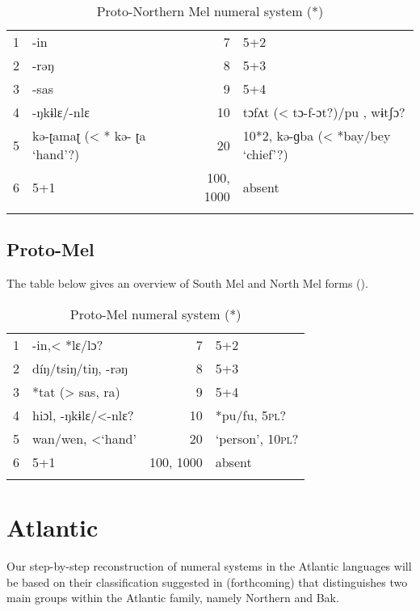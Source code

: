 {\begin{table}
\caption{\label{tab:3:218}Proto-Northern Mel numeral system (*)}


\begin{tabularx}{\textwidth}{lQrQ}
\lsptoprule

1 & -in & 7 & 5+2\\
2 & -rəŋ & 8 & 5+3\\
3 & -sas & 9 & 5+4\\
4 & -ŋkɨlɛ/-nlɛ & 10 & tɔfʌt (< tɔ-f-ɔt?)/pu , wɨtʃɔ? \\
5 & kə-ʈamaʈ (< * kə- ʈa ‘hand’?) & 20 & 10*2, kə-ɡba (< *bay/bey ‘chief’?)\\
6 & 5+1 & 100, 1000 & absent\\
\lspbottomrule
\end{tabularx}
\end{table}

\clearpage
\subsection{Proto-Mel}%
The table below gives an overview of South Mel and North Mel forms ().

\begin{table}
\caption{\label{tab:3:219}Proto-Mel numeral system (*)}


\begin{tabularx}{\textwidth}{lQrQ}
\lsptoprule

1 & -in,< *lɛ/lɔ? & 7 & 5+2\\
2 & díŋ/tsiŋ/tiŋ, -rəŋ & 8 & 5+3\\
3 & *tat (> sas, ra) & 9 & 5+4\\
4 & hiɔl, -ŋkɨlɛ/<-nlɛ? & 10 & *pu/fu, 5\textsc{pl}? \\
5 & wan/wen, <‘hand’ & 20 & ‘person’, 10\textsc{pl}? \\
6 & 5+1 &  {100,} 1000 & absent\\
\lspbottomrule
\end{tabularx}

\end{table}
\section{Atlantic}%

Our step-by-step reconstruction of numeral systems in the Atlantic languages will be based on their classification suggested in \citealt{PozdniakovSegerer2017} (forthcoming) that distinguishes two main groups within the Atlantic family, namely Northern and Bak.


}

